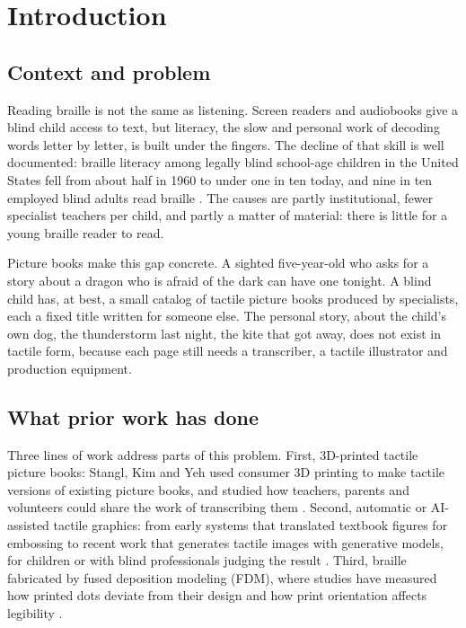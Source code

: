 \documentclass[conference]{IEEEtran}
\begin{document}
\section{Introduction}\label{sec:intro}

\subsection{Context and problem}

Reading braille is not the same as listening. Screen readers and audiobooks give a blind child access to text, but literacy, the slow and personal work of decoding words letter by letter, is built under the fingers. The decline of that skill is well documented: braille literacy among legally blind school-age children in the United States fell from about half in 1960 to under one in ten today, and nine in ten employed blind adults read braille \cite{nfb2024}. The causes are partly institutional, fewer specialist teachers per child, and partly a matter of material: there is little for a young braille reader to read.

Picture books make this gap concrete. A sighted five-year-old who asks for a story about a dragon who is afraid of the dark can have one tonight. A blind child has, at best, a small catalog of tactile picture books produced by specialists, each a fixed title written for someone else. The personal story, about the child's own dog, the thunderstorm last night, the kite that got away, does not exist in tactile form, because each page still needs a transcriber, a tactile illustrator and production equipment.

\subsection{What prior work has done}

Three lines of work address parts of this problem. First, 3D-printed tactile picture books: Stangl, Kim and Yeh used consumer 3D printing to make tactile versions of existing picture books, and studied how teachers, parents and volunteers could share the work of transcribing them \cite{stangl2014,stangl2015,kim2015}. Second, automatic or AI-assisted tactile graphics: from early systems that translated textbook figures for embossing \cite{jayant2007} to recent work that generates tactile images with generative models, for children \cite{talevision} or with blind professionals judging the result \cite{tactilenet,altcanvas,tanaka2025}. Third, braille fabricated by fused deposition modeling (FDM), where studies have measured how printed dots deviate from their design and how print orientation affects legibility \cite{zolek2024,puerta2024}.
\end{document}
